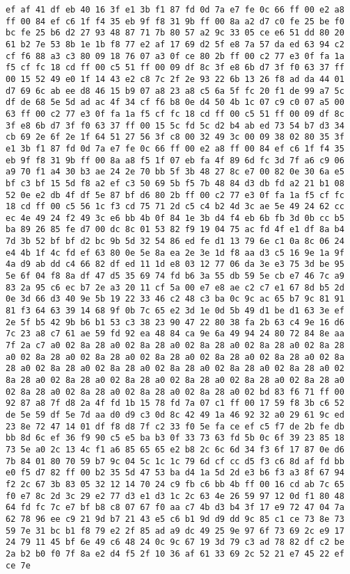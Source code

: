 \documentclass{article}
\begin{document}
\begin{verbatim}
ef af 41 df eb 40 16 3f e1 3b f1 87 fd 0d 7a e7 fe 0c 66 ff 00 e2 a8 ff 00 84 ef c6 1f f4 35 eb 9f f8 31 9b ff 00 8a a2 d7 c0 fe 25 be f0 bc fe 25 b6 d2 27 93 48 87 71 7b 80 57 a2 9c 33 05 ce e6 51 dd 80 20 61 b2 7e 53 8b 1e 1b f8 77 e2 af 17 69 d2 5f e8 7a 57 da ed 63 94 c2 cf f6 88 a3 c3 80 09 18 76 07 a3 0f ce 80 2b ff 00 c2 77 e3 0f fa 1a f5 cf fc 18 cd ff 00 c5 51 ff 00 09 df 8c 3f e8 6b d7 3f f0 63 37 ff 00 15 52 49 e0 1f 14 43 e2 c8 7c 2f 2e 93 22 6b 13 26 f8 ad da 44 01 d7 69 6c ab ee d8 46 15 b9 07 a8 23 a8 c5 6a 5f fc 20 f1 de 99 a7 5c df de 68 5e 5d ad ac 4f 34 cf f6 b8 0e d4 50 4b 1c 07 c9 c0 07 a5 00 63 ff 00 c2 77 e3 0f fa 1a f5 cf fc 18 cd ff 00 c5 51 ff 00 09 df 8c 3f e8 6b d7 3f f0 63 37 ff 00 15 5c fd 5c d2 b4 ab ed 73 54 b7 d3 34 cb 69 2e 6f 2e 1f 64 51 27 56 3f c8 00 32 49 3c 00 09 38 02 80 35 3f e1 3b f1 87 fd 0d 7a e7 fe 0c 66 ff 00 e2 a8 ff 00 84 ef c6 1f f4 35 eb 9f f8 31 9b ff 00 8a a8 f5 1f 07 eb fa 4f 89 6d fc 3d 7f a6 c9 06 a9 70 f1 a4 30 b3 ae 24 2e 70 bb 5f 3b 48 27 8c e7 00 82 0e 30 6a e5 bf c3 bf 15 5d f8 a2 ef c3 50 69 5b f5 7b 48 84 d3 db fd a2 21 b1 08 52 0e e2 db 4f df 5e 87 bf d6 80 2b ff 00 c2 77 e3 0f fa 1a f5 cf fc 18 cd ff 00 c5 56 1c f3 cd 75 71 2d c5 c4 b2 4d 3c ae 5e 49 24 62 cc ec 4e 49 24 f2 49 3c e6 bb 4b 0f 84 1e 3b d4 f4 eb 6b fb 3d 0b cc b5 ba 89 26 85 fe d7 00 dc 8c 01 53 82 f9 19 04 75 ac fd 4f e1 df 8a b4 7d 3b 52 bf bf d2 bc 9b 5d 32 54 86 ed fe d1 13 79 6e c1 0a 8c 06 24 e4 4b 1f 4c fd ef 63 80 0e 5e 8a ea 2e 3e 1d f8 aa d3 c5 16 9e 1a 9f 4a d9 ab dd c4 66 82 df ed 11 1d e8 03 12 77 06 da 3e e3 75 3d be 95 5e 6f 04 f8 8a df 47 d5 35 69 74 fd b6 3a 55 db 59 5e cb e7 46 7c a9 83 2a 95 c6 ec b7 2e a3 20 11 cf 5a 00 e7 e8 ae c2 c7 e1 67 8d b5 2d 0e 3d 66 d3 40 9e 5b 19 22 33 46 c2 48 c3 ba 0c 9c ac 65 b7 9c 81 91 81 f3 64 63 39 14 68 9f 0b 7c 65 e2 3d 1e 0d 5b 49 d1 be d1 63 3e ef 2e 5f b5 42 9b b6 b1 53 c3 38 23 90 47 22 80 38 fa 2b 63 c4 9e 16 d6 7c 23 a8 c7 61 ae 59 fd 92 ea 48 84 ca 9e 6a 49 94 24 80 72 84 8e aa 7f 2a c7 a0 02 8a 28 a0 02 8a 28 a0 02 8a 28 a0 02 8a 28 a0 02 8a 28 a0 02 8a 28 a0 02 8a 28 a0 02 8a 28 a0 02 8a 28 a0 02 8a 28 a0 02 8a 28 a0 02 8a 28 a0 02 8a 28 a0 02 8a 28 a0 02 8a 28 a0 02 8a 28 a0 02 8a 28 a0 02 8a 28 a0 02 8a 28 a0 02 8a 28 a0 02 8a 28 a0 02 8a 28 a0 02 8a 28 a0 02 8a 28 a0 02 8a 28 a0 02 8a 28 a0 02 bd 83 f6 71 ff 00 92 87 a8 7f d8 2a 4f fd 1b 15 78 fd 7a 07 c1 ff 00 17 59 f8 3b c6 52 de 5e 59 df 5e 7d aa d0 d9 c3 0d 8c 42 49 1a 46 92 32 a0 29 61 9c ed 23 8e 72 47 14 01 df f8 d8 7f c2 33 f0 5e fa ce ef c5 f7 de 2b fe db bb 8d 6c ef 36 f9 90 c5 e5 ba b3 0f 33 73 63 fd 5b 0c 6f 39 23 85 18 73 5e a0 2c 13 4c f1 a6 85 65 65 e2 b8 2c 6c 6d 34 f3 6f 17 87 0e d6 7b 84 01 80 70 59 b7 9c 04 5c 1c 1c 79 6d cf cc d5 f3 c6 8d af fd bb e0 f5 d7 82 ff 00 b2 35 5d 47 53 ba d4 1a 5d 2d e3 b6 f3 a3 8f 67 94 f2 2c 67 3b 83 05 32 12 14 70 24 c9 fb c6 bb 4b ff 00 16 cd ab 7c 65 f0 e7 8c 2d 3c 29 e2 77 d3 e1 d3 1c 2c 63 4e 26 59 97 12 0d f1 80 48 64 fd fc 7c e7 bf b8 c8 07 67 f0 aa c7 4b d3 b4 3f 17 e9 72 47 04 7a 62 78 96 ee c9 21 9d b7 21 43 e5 c6 b1 9d d9 dd 9c 85 c1 ce 73 8e 73 59 7e 31 bc b1 f8 79 e2 2f 85 ad a9 dc 49 25 9e 97 6f 73 69 2c e9 17 24 79 11 45 bf 6e 49 c6 48 24 0c 9c 67 19 3d 79 c3 ad 78 82 df c2 be 2a b2 b0 f0 7f 8a e2 d4 f5 2f 10 36 af 61 33 69 2c 52 21 e7 45 22 ef ce 7e 
\end{verbatim}
\end{document}

